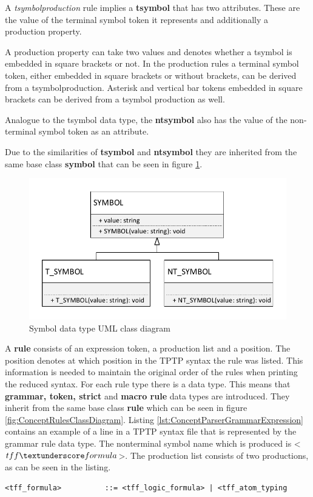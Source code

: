 A \textit{t\textunderscore symbol\textunderscore  production} rule implies a \textbf{t\textunderscore symbol} that has two attributes. These are the value of the terminal symbol token it represents and additionally a production property.

A production property can take two values and denotes whether a t\textunderscore  symbol is embedded in square brackets or not. In the production rules a terminal symbol token, either embedded in square brackets or without brackets, can be derived from a t\textunderscore  symbol\textunderscore  production. Asterisk and vertical bar tokens embedded in square brackets can be derived from a t\textunderscore  symbol production as well. 

Analogue to the t\textunderscore symbol data type, the \textbf{nt\textunderscore  symbol} also has the value of the non-terminal symbol token as an attribute. 

Due to the similarities of \textbf{t\textunderscore symbol} and \textbf{nt\textunderscore  symbol} they are inherited from the same base class \textbf{symbol} that can be seen in figure \ref{fig:ConceptSymbolsClassDiagram}.

\begin{figure}[H]
\centering
\includegraphics[width=.8\textwidth]{images/Concept_uml_data_types_symbols.pdf}
\caption{Symbol data type UML class diagram}
\label{fig:ConceptSymbolsClassDiagram}
\end{figure}

A \textbf{rule} consists of an expression token, a production list and a position.
The position denotes at which position in the TPTP syntax the rule was listed.
This information is needed to maintain the original order of the rules when printing the reduced syntax.
For each rule type there is a data type.
This means that \textbf{grammar, token, strict} and \textbf{macro rule} data types are introduced. They inherit from the same base class \textbf{rule} which can be seen in figure \ref{fig:ConceptRulesClassDiagram}.
Listing \ref{lst:ConceptParserGrammarExpression} contains an example of a line in a \ac{TPTP} syntax file that is represented by the grammar rule data type.
The nonterminal symbol name which is produced is <$tff \textunderscore formula$>.  The production list consists of two productions, as can be seen in the listing.
\begin{lstlisting}[basicstyle=\scriptsize	,caption= Grammar expression,label= lst:ConceptParserGrammarExpression]
<tff_formula>          ::= <tff_logic_formula> | <tff_atom_typing
\end{lstlisting}

